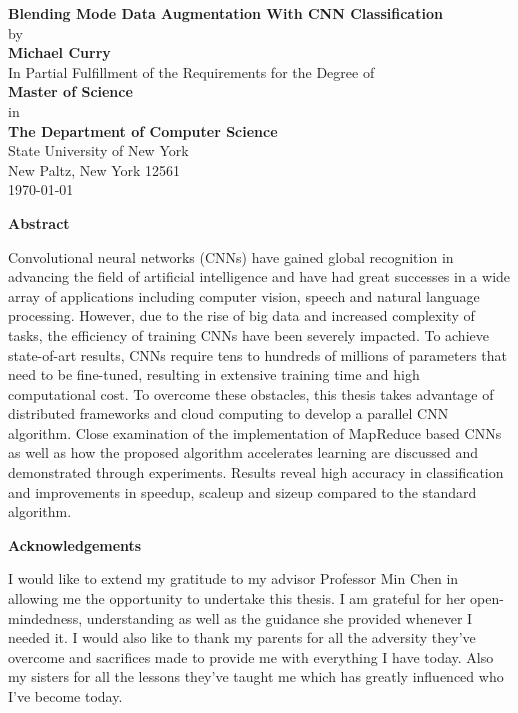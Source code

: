 \documentclass[12pt]{report}
\begin{document}
\begin{titlepage}
\begin{center}
\vfill
\Large{\textbf{Blending Mode Data Augmentation With CNN Classification}}\\[3mm]
\vfill
by\\ 
\textbf{Michael Curry}\\
In Partial Fulfillment of the Requirements for the Degree of\\
\textbf{Master of Science}\\
\vfill
in\\
\textbf{The Department of Computer Science}\\
State University of New York\\
New Paltz, New York 12561\\
\today
\end{center}
\end{titlepage}

\thispagestyle{plain}
\begin{center}
\textbf{Abstract}
\end{center}

Convolutional neural networks (CNNs) have gained global recognition in advancing the field of artificial intelligence and have had great successes in a wide array of applications including computer vision, speech and natural language processing. However, due to the rise of big data and increased complexity of tasks, the efficiency of training CNNs have been severely impacted. To achieve state-of-art results, CNNs require tens to hundreds of millions of parameters that need to be fine-tuned, resulting in extensive training time and high computational cost. To overcome these obstacles, this thesis takes advantage of distributed frameworks and cloud computing to develop a parallel CNN algorithm. Close examination of the implementation of MapReduce based CNNs as well as how the proposed algorithm accelerates learning are discussed and demonstrated through experiments. Results reveal high accuracy in classification and improvements in speedup, scaleup and sizeup compared to the standard algorithm.

\newpage
\thispagestyle{plain}
\begin{center}
\textbf{Acknowledgements}
\end{center}

I would like to extend my gratitude to my advisor Professor Min Chen in allowing me the opportunity to undertake this thesis. I am grateful for her open-mindedness, understanding as well as the guidance she provided whenever I needed it. I would also like to thank my parents for all the adversity they've overcome and sacrifices made to provide me with everything I have today. Also my sisters for all the lessons they've taught me which has greatly influenced who I've become today.
\end{document}
